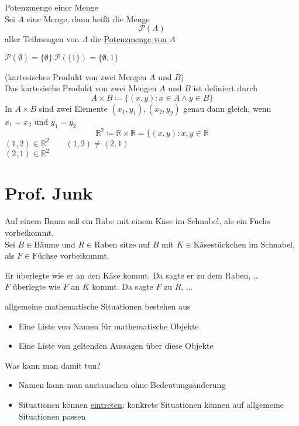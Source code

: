 \documentclass[a4paper, markcase = upper, parskip = true, fleqn]{scrartcl}
\begin{document}
\begin{definitionbox}
	Potenzmenge einer Menge\\
	Sei $A$ eine Menge, dann heißt die Menge
	\[\mathcal{P}(A)\]
	aller Teilmengen von $A$ die \underline{Potenzmenge von $A$}
\end{definitionbox}
$\mathcal{P}(\emptyset) = \{\emptyset\}\:\mathcal{P}(\{1\}) = \{\emptyset, 1\}$
\begin{definitionbox}
	(kartesisches Produkt von zwei Mengen $A$ und $B$)\\
	Das kartesische Produkt von zwei Mengen $A$ und $B$ ist definiert durch
	\[A \times B \coloneqq \{(x,y): x \in A \wedge y \in B\}\]
	In $A \times B$ sind zwei Elemente $(x_1, y_1), (x_2, y_2)$ genau dann gleich, wenn $x_1 = x_2$ und $y_1 = y_2$
	\[\mathbb{R}^2 \coloneqq \mathbb{R} \times \mathbb{R} = \{(x, y): x, y \in \mathbb{R}\]
	\indent\indent $(1,2) \in \mathbb{R}^2 \qquad (1,2) \neq (2,1)$\\
	\indent\indent $(2,1) \in \mathbb{R}^2$
\end{definitionbox}

\section{Prof. Junk}
Auf einem Baum saß ein Rabe mit einem Käse im Schnabel, als ein Fuchs vorbeikommt.\\
Sei $B \in \text{Bäume}$ und $R \in \text{Raben}$ sitze auf $B$ mit $K \in \text{Käsestückchen}$ im Schnabel, als $F \in \text{Füchse}$ vorbeikommt.\par
Er überlegte wie er an den Käse kommt. Da sagte er zu dem Raben, ...\\
$F$ überlegte wie $F$ an $K$ kommt. Da sagte $F$ zu $R$, ...\par

allgemeine mathematische Situationen bestehen aus
\begin{itemize}
	\item Eine Liste von Namen für mathematische Objekte
	\item Eine Liste von geltenden Aussagen über diese Objekte
\end{itemize}
Was kann man damit tun?
\begin{itemize}
	\item Namen kann man austauschen ohne Bedeutungsänderung
	\item Situationen können \underline{eintreten}; konkrete Situationen können auf allgemeine Situationen passen
\end{itemize}
\end{document}
